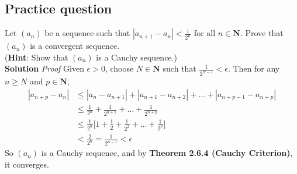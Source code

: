 \documentclass[12pt]{report}
\begin{document}
\subsection*{Practice question}
Let $(a_n)$ be a sequence such that $|a_{n+1}-a_n|<\frac{1}{2^n}$ for all $n \in \mathbf{N}$. Prove that $(a_n)$ is a convergent sequence.\\
(\textbf{Hint}: Show that $(a_n)$ is a Cauchy sequence.)\\
\textbf{Solution} \textit{Proof} Given $\epsilon > 0$, choose $N \in \mathbf{N}$ such that $\frac{1}{2^{N-1}}< \epsilon$. Then for any $n \geq N$ and $p \in \mathbf{N}$,
\begin{align*}
    |a_{n+p} -a_n| & \leq |a_n -a_{n+1}| + |a_{n+1}-a_{n+2}| + \ldots + |a_{n+p-1}-a_{n+p}|\\
                    & \leq \frac{1}{2^n} +\frac{1}{2^{n+1}} +\ldots + \frac{1}{2^{n+p}}\\
                    & \leq \frac{1}{2^n}\big[ 1+ \frac{1}{2} +\frac{1}{2^2} +\ldots+\frac{1}{2^p}\big]\\
                    & < \frac{2}{2^n} = \frac{1}{2^{n-1}} < \epsilon 
\end{align*}
So $(a_n)$ is a Cauchy sequence, and by \textbf{Theorem 2.6.4 (Cauchy Criterion)}, it converges.
\end{document}
